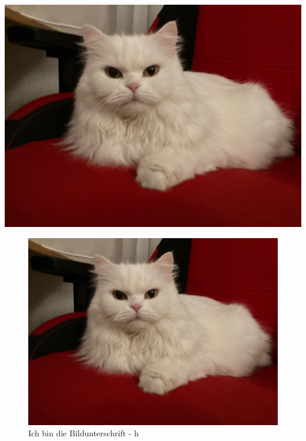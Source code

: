 \documentclass[12pt,ngerman]{scrartcl}
\begin{document}
\blindtext[2]

\includegraphics[width=\textwidth]{Bilder/Katze}

\blindtext[2]

\begin{figure}[h] %
\includegraphics[width=\textwidth]{Bilder/Katze}
\caption{Ich bin die Bildunterschrift - h}
\end{figure}

\blindtext[2]
\end{document}
